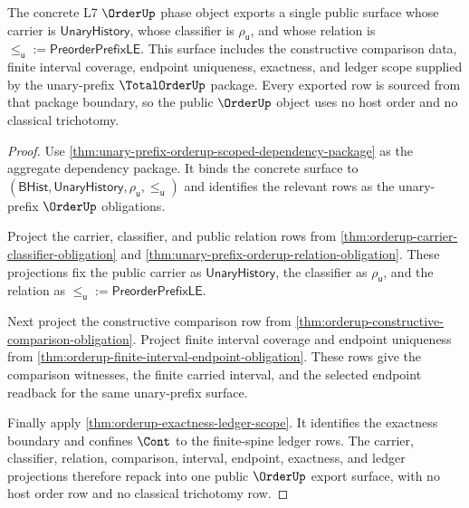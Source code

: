 \begin{theorem}
\label{thm:orderup-unary-prefix-public-export}
The concrete L7 $\OrderUp$ phase object exports a single public surface whose
carrier is $\mathsf{UnaryHistory}$, whose classifier is $\rho_{\mathsf{u}}$,
and whose relation is
$\le_{\mathsf{u}} := \mathsf{PreorderPrefixLE}$. This surface includes the
constructive comparison data, finite interval coverage, endpoint uniqueness,
exactness, and ledger scope supplied by the unary-prefix $\TotalOrderUp$
package. Every exported row is sourced from that package boundary, so the
public $\OrderUp$ object uses no host order and no classical trichotomy.
\end{theorem}
\begin{proof}
Use \autoref{thm:unary-prefix-orderup-scoped-dependency-package} as the
aggregate dependency package. It binds the concrete surface to
$(\mathsf{BHist},\mathsf{UnaryHistory},\rho_{\mathsf{u}},\le_{\mathsf{u}})$
and identifies the relevant rows as the unary-prefix $\OrderUp$ obligations.

Project the carrier, classifier, and public relation rows from
\autoref{thm:orderup-carrier-classifier-obligation} and
\autoref{thm:unary-prefix-orderup-relation-obligation}. These projections fix
the public carrier as $\mathsf{UnaryHistory}$, the classifier as
$\rho_{\mathsf{u}}$, and the relation as
$\le_{\mathsf{u}} := \mathsf{PreorderPrefixLE}$.

Next project the constructive comparison row from
\autoref{thm:orderup-constructive-comparison-obligation}. Project finite
interval coverage and endpoint uniqueness from
\autoref{thm:orderup-finite-interval-endpoint-obligation}. These rows give the
comparison witnesses, the finite carried interval, and the selected endpoint
readback for the same unary-prefix surface.

Finally apply \autoref{thm:orderup-exactness-ledger-scope}. It identifies the
exactness boundary and confines $\Cont$ to the finite-spine ledger rows. The
carrier, classifier, relation, comparison, interval, endpoint, exactness, and
ledger projections therefore repack into one public $\OrderUp$ export surface,
with no host order row and no classical trichotomy row.
\end{proof}


